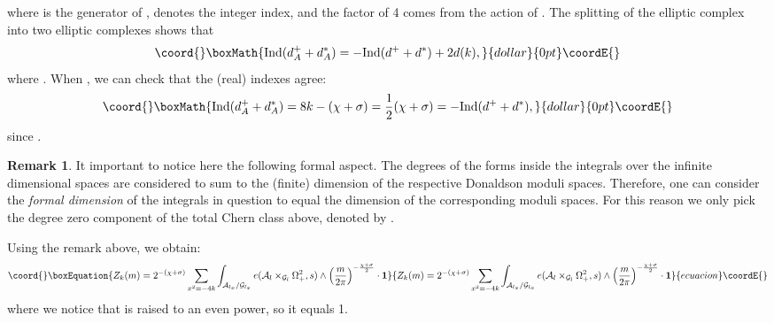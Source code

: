 \documentclass[a4paper,12pt,reqno,sumlimits]{amsart}
\theoremstyle{plain}
\theoremstyle{definition}
\newtheorem{rem}[thm]{Remark}
\providecommand{\1}{{\bf 1}}
\providecommand{\uu}{{\mathfrak  u}}
\providecommand{\calA}{{\mathcal A}}
\providecommand{\calG}{{\mathcal G}}
\providecommand{\calM}{{\mathcal M}}
\providecommand{\Ind}{{\operatorname{Ind}}}
\numberwithin{equation}{section}
\begin{document}
where \coordHE{} is the generator of \myHighlight{$\uu(1)^*$}\coordHE{}, \myHighlight{$\Ind$}\coordHE{} denotes the integer
index, and the factor of 4 comes from the \coordHE{} action of \coordHE{}.  The
splitting of the elliptic complex into two elliptic complexes shows that
$$\coord{}\boxMath{
\Ind(d_A^++d_A^*)=-\Ind(d^++d^*)+2d(k),
}{dollar}{0pt}\coordE{}$$
where \myHighlight{$2d(k)=\dim\calM_k$}\coordHE{}. When \coordHE{}, we can check that the (real)
indexes agree:
$$\coord{}\boxMath{
\Ind(d_A^++d_A^*)=8k-(\chi+\sigma)=\frac{1}{2}(\chi+\sigma)=-\Ind(d^++d^*),
}{dollar}{0pt}\coordE{}$$
since \coordHE{}. 

\begin{rem}
  \label{dimaspect}
  It important to notice here the following formal aspect. The degrees of the
  forms inside the integrals over the infinite dimensional spaces
  \myHighlight{$\calA_{l_x}/\calG_{l_x}$}\coordHE{} are considered to sum to the (finite) dimension
  of the respective Donaldson moduli spaces. Therefore, one can consider the
  {\em formal dimension} of the integrals in question to equal the dimension
  of the corresponding moduli spaces. For this reason we only pick the degree
  zero component of the total Chern class above, denoted by \myHighlight{$\1$}\coordHE{}.
\end{rem}
Using the remark above, we obtain:
\begin{equation}\coord{}\boxEquation{
  \label{dwabloc2}
  Z_k(m)=2^{-(\chi+\sigma)}\sum_{x^2=-4k}\int_{\calA_{l_x}/\calG_{l_x}}
  e(\calA_l\times_{\calG_l}\Omega^2_+,s)\wedge 
  \left(\frac{m}{2\pi}\right)^{-\frac{\chi+\sigma}{2}}\cdot\1
}{
  Z_k(m)=2^{-(\chi+\sigma)}\sum_{x^2=-4k}\int_{\calA_{l_x}/\calG_{l_x}}
  e(\calA_l\times_{\calG_l}\Omega^2_+,s)\wedge 
  \left(\frac{m}{2\pi}\right)^{-\frac{\chi+\sigma}{2}}\cdot\1
}{ecuacion}\coordE{}\end{equation}
where we notice that \coordHE{} is raised to an even power, so it equals 1.
\end{document}
